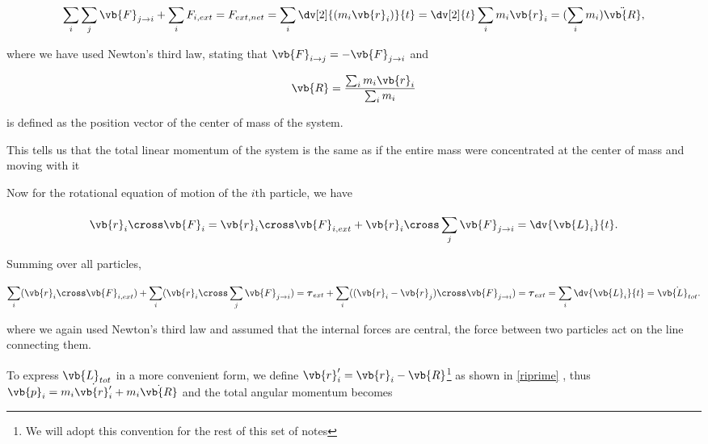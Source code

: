 \documentclass[a4paper,12pt]{report}
\begin{document}
\begin{equation}
	\sum_{i}^{} \sum_{j}^{} \vb{F} _{j \rightarrow i} + \sum_{i}^{} F_{i,ext} = F_{ext, net } =  \sum_{i}^{} \dv[2]{(m_{i} \vb{r} _{i} )}{t} = \dv[2]{t} \sum_{i}^{} m_{i} \vb{r} _{i} =  (\sum_{i}^{} m_{i} ) \ddot{\vb{R} },
\end{equation}

where we have used Newton's third law, stating that \(\vb{F} _{i \rightarrow j} = -\vb{F} _{j \rightarrow i} \) and  

\begin{equation}
	\vb{R} = \frac{\sum_{i}^{} m_{i} \vb{r} _{i} }{\sum_{i}^{} m_{i}  } 
\end{equation}

is defined as the position vector of the center of mass of the system.

This tells us that the total linear momentum of the system is the same as if the entire mass were concentrated at the center of mass and moving with it

Now for the rotational equation of motion of the \(i \text{th} \) particle, we have

\begin{equation}
	 \vb{r }_{i}  \cross \vb{F} _{i} = \vb{r} _{i} \cross \vb{F} _{i, ext} + \vb{r} _{i} \cross \sum_{j}^{} \vb{F} _{j \rightarrow i} = \dv{\vb{L} _{i}  }{t}. 
\end{equation}

Summing over all particles, 

\begin{equation}
	\sum_{i}^{} (\vb{r} _{i} \cross \vb{F} _{i,ext}) + \sum_{i}^{} (\vb{r} _{i} \cross \sum_{j}^{} \vb{F} _{j \rightarrow i}) = \boldsymbol{\tau }_{ext}  + \sum_{i}^{} ((\vb{r} _{i} - \vb{r} _{j} ) \cross  \vb{F} _{j \rightarrow  i } ) = \boldsymbol{\tau } _{ext} = \sum_{i}^{} \dv{\vb{L} _{i} }{t} = \dot{\vb{L}_{tot}}. 
\end{equation}

where we again used Newton's third law and assumed that the internal forces are central, \ie the force between two particles act on the line connecting them.

To express \(\vb{L} _{tot} \) in a more convenient form, we define \(\vb{r}'_{i} = \vb{r} _{i} - \vb{R}  \)\footnote{We will adopt this convention for the rest of this set of notes}  as shown in \cref{riprime}  , thus \(\vb{p} _{i} = m_{i}\dot{\vb{r} '_{i} }  + m_{i} \dot{\vb{R} }  \) and the total angular momentum becomes 
\end{document}
